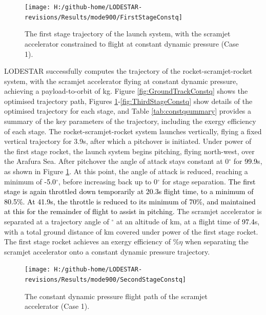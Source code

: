 \begin{figure}[ht!] %
	\centering
	\texttt{[image: H:/github-home/LODESTAR-revisions/Results/mode900/FirstStageConstq]}
	\caption{The first stage trajectory of the launch system, with the scramjet accelerator constrained to flight at constant dynamic pressure (Case 1).}
	\label{fig:FirstStageConstq}
\end{figure}
LODESTAR successfully computes the trajectory of the rocket-scramjet-rocket system, with the scramjet accelerator flying at constant dynamic pressure, achieving a payload-to-orbit of \PayloadToOrbitConstqNoReturn kg.
Figure \ref{fig:GroundTrackConstq} shows the optimised trajectory path, Figures \ref{fig:FirstStageConstq}-\ref{fig:ThirdStageConstq} show details of the optimised trajectory for each stage, and Table \ref{tab:constqsummary} provides a summary of the key parameters of the trajectory, including the exergy efficiency of each stage.
The rocket-scramjet-rocket system launches vertically, flying a fixed vertical trajectory for 3.9s, after which a pitchover is initiated. Under power of the first stage rocket, the launch system begins pitching, flying north-west, over the Arafura Sea. 
After pitchover the angle of attack stays constant at 0$^\circ$ for \textcolor{black}{99.9}s, as shown in Figure \ref{fig:FirstStageConstq}. At this point, the angle of attack is reduced, reaching a minimum of \textcolor{black}{-5.0}$^\circ$, before increasing back up to 0$^\circ$ for stage separation. \textcolor{black}{The first stage is again throttled down temporarily at 20.3s flight time, to a minimum of 80.5\%. At 41.9s, the throttle is reduced to its minimum of 70\%, and maintained at this for the remainder of flight to assist in pitching. }
The scramjet accelerator is separated at a trajectory angle of \firstsecondSeparationgammaConstqNoReturn$^\circ$ at an altitude of \firstsecondSeparationAltConstqNoReturn km, at a flight time of \textcolor{black}{97.4}s, with a total ground distance of \FirstStageDistStandardNoReturn km covered under power of the first stage rocket. 
The first stage rocket achieves an exergy efficiency of \firstExergyEffConstqNoReturn\%$\eta$ when separating the scramjet accelerator onto a constant dynamic pressure trajectory. 
\begin{figure}[ht!]%
\centering
\texttt{[image: H:/github-home/LODESTAR-revisions/Results/mode900/SecondStageConstq]}
\caption{The constant dynamic pressure flight path of the scramjet accelerator (Case 1).}
\label{fig:SecondStageConstq}
\end{figure}


